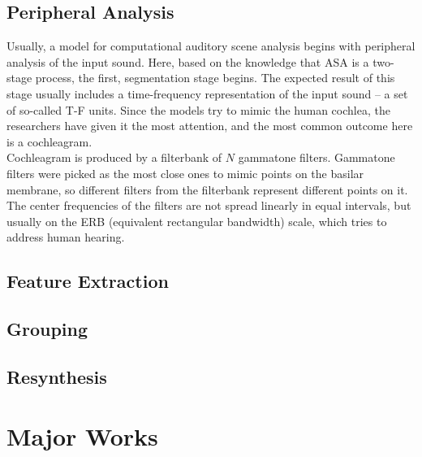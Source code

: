 \subsection{Peripheral Analysis}

Usually, a model for computational auditory scene analysis begins with peripheral analysis of the input sound. Here, based on the knowledge that ASA is a two-stage process, the first, segmentation stage begins. The expected result of this stage usually includes a time-frequency representation of the input sound -- a set of so-called T-F units. Since the models try to mimic the human cochlea, the researchers have given it the most attention, and the most common outcome here is a cochleagram.\\

Cochleagram is produced by a filterbank of $N$ gammatone filters. Gammatone filters were picked as the most close ones to mimic points on the basilar membrane, so different filters from the filterbank represent different points on it. The center frequencies of the filters are not spread linearly in equal intervals, but usually on the ERB (equivalent rectangular bandwidth) scale, which tries to address human hearing.

\subsection{Feature Extraction}
\subsection{Grouping}
\subsection{Resynthesis}



\section{Major Works}

